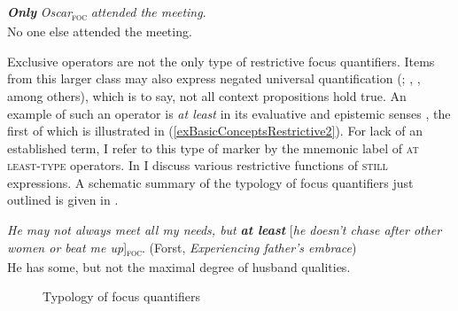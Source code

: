 \begin{exe}
	\ex\label{exBasicConceptsRestrictive1}
	\textbf{\textit{Only}} \textit{Oscar}\textsubscript{\textsc{foc}} \textit{attended the meeting}.\\
	\rightarrow{ }No one else attended the meeting.
\end{exe}
\largerpage[-1]

Exclusive operators are not the only type of restrictive focus quantifiers. Items from this larger class may also express negated universal quantification (\cite{Gast2012}; \cite{Hole2004}, \citeyear{Hole2006}, among others), which is to say, not all context propositions hold true. An example of such an operator is  \textit{at least} in its evaluative and epistemic senses \parencite{Gast2012}, the first of which is illustrated in (\ref{exBasicConceptsRestrictive2}). For lack of an established term, I refer to this type of marker by the mnemonic label of \textsc{at least}-\textsc{type} operators. In  I discuss various restrictive functions of \textsc{still} expressions. A schematic summary of the typology of focus quantifiers just outlined is given in .

\begin{exe}
	\ex\label{exBasicConceptsRestrictive2}
	\textit{He may not always meet all my needs, but} \textbf{\textit{at least}} {[}\textit{he doesn’t chase after other women or beat me up}]\textsubscript{\textsc{foc}}{}\textsubscript{\textsc{}}. (Forst, \textit{Experiencing father's embrace})\\
	\rightarrow{ }He has some, but not the maximal degree of husband qualities.
\end{exe}

\begin{figure}[hbt]
	\caption{Typology of focus quantifiers\label{figureFocusQuantifiers}}
\end{figure}

